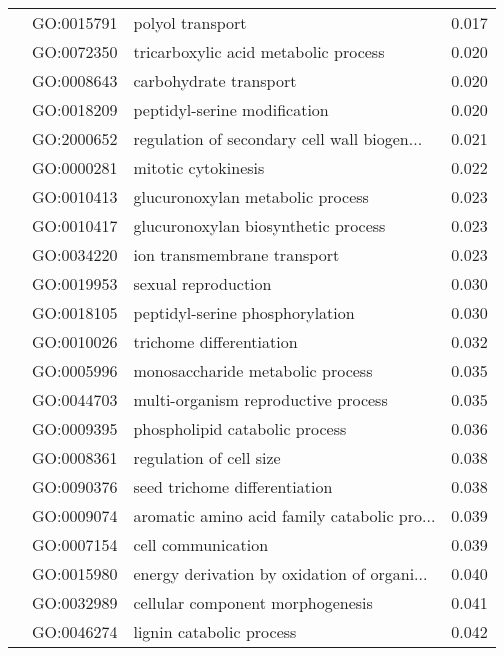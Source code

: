 \begin{longtable}{lllr}
   & GO:0015791 &                             polyol transport &         0.017 \\
   & GO:0072350 &         tricarboxylic acid metabolic process &         0.020 \\
   & GO:0008643 &                       carbohydrate transport &         0.020 \\
   & GO:0018209 &                 peptidyl-serine modification &         0.020 \\
   & GO:2000652 &  regulation of secondary cell wall biogen... &         0.021 \\
   & GO:0000281 &                          mitotic cytokinesis &         0.022 \\
   & GO:0010413 &             glucuronoxylan metabolic process &         0.023 \\
   & GO:0010417 &          glucuronoxylan biosynthetic process &         0.023 \\
   & GO:0034220 &                  ion transmembrane transport &         0.023 \\
   & GO:0019953 &                          sexual reproduction &         0.030 \\
   & GO:0018105 &              peptidyl-serine phosphorylation &         0.030 \\
   & GO:0010026 &                     trichome differentiation &         0.032 \\
   & GO:0005996 &             monosaccharide metabolic process &         0.035 \\
   & GO:0044703 &          multi-organism reproductive process &         0.035 \\
   & GO:0009395 &               phospholipid catabolic process &         0.036 \\
   & GO:0008361 &                      regulation of cell size &         0.038 \\
   & GO:0090376 &                seed trichome differentiation &         0.038 \\
   & GO:0009074 &  aromatic amino acid family catabolic pro... &         0.039 \\
   & GO:0007154 &                           cell communication &         0.039 \\
   & GO:0015980 &  energy derivation by oxidation of organi... &         0.040 \\
   & GO:0032989 &             cellular component morphogenesis &         0.041 \\
   & GO:0046274 &                     lignin catabolic process &         0.042 \\

\end{longtable}
